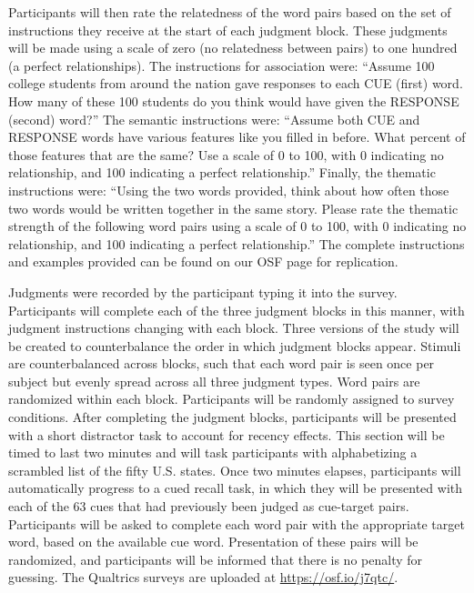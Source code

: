 \documentclass[english,man]{apa6}
\theoremstyle{definition}
\theoremstyle{definition}
\theoremstyle{definition}
\theoremstyle{remark}
\begin{document}
Participants will then rate the relatedness of the word pairs based on
the set of instructions they receive at the start of each judgment
block. These judgments will be made using a scale of zero (no
relatedness between pairs) to one hundred (a perfect relationships). The
instructions for association were: \enquote{Assume 100 college students
from around the nation gave responses to each CUE (first) word. How many
of these 100 students do you think would have given the RESPONSE
(second) word?} The semantic instructions were: \enquote{Assume both CUE
and RESPONSE words have various features like you filled in before. What
percent of those features that are the same? Use a scale of 0 to 100,
with 0 indicating no relationship, and 100 indicating a perfect
relationship.} Finally, the thematic instructions were: \enquote{Using
the two words provided, think about how often those two words would be
written together in the same story. Please rate the thematic strength of
the following word pairs using a scale of 0 to 100, with 0 indicating no
relationship, and 100 indicating a perfect relationship.} The complete
instructions and examples provided can be found on our OSF page for
replication.

Judgments were recorded by the participant typing it into the survey.
Participants will complete each of the three judgment blocks in this
manner, with judgment instructions changing with each block. Three
versions of the study will be created to counterbalance the order in
which judgment blocks appear. Stimuli are counterbalanced across blocks,
such that each word pair is seen once per subject but evenly spread
across all three judgment types. Word pairs are randomized within each
block. Participants will be randomly assigned to survey conditions.
After completing the judgment blocks, participants will be presented
with a short distractor task to account for recency effects. This
section will be timed to last two minutes and will task participants
with alphabetizing a scrambled list of the fifty U.S. states. Once two
minutes elapses, participants will automatically progress to a cued
recall task, in which they will be presented with each of the 63 cues
that had previously been judged as cue-target pairs. Participants will
be asked to complete each word pair with the appropriate target word,
based on the available cue word. Presentation of these pairs will be
randomized, and participants will be informed that there is no penalty
for guessing. The Qualtrics surveys are uploaded at
\url{https://osf.io/j7qtc/}.
\end{document}
